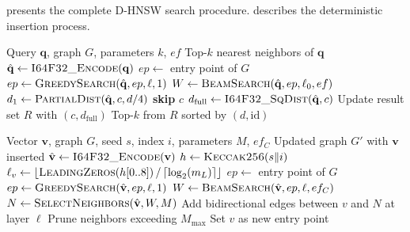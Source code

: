 \documentclass[10pt,journal]{IEEEtran}
\newcommand{\dhnsw}{\textsc{D-HNSW}}
\begin{document}
 presents the complete \dhnsw{} search procedure.  describes the deterministic insertion process.

\begin{algorithm}[t]
  \caption{\dhnsw{} Deterministic Search}
  \label{alg:dhnsw_search}
  \begin{algorithmic}[1]
    \REQUIRE Query $\mathbf{q}$, graph $G$, parameters $k$, $ef$
    \ENSURE Top-$k$ nearest neighbors of $\mathbf{q}$
    \STATE $\hat{\mathbf{q}} \leftarrow \textsc{I64F32\_Encode}(\mathbf{q})$
    \STATE $ep \leftarrow$ entry point of $G$
      \STATE $ep \leftarrow \textsc{GreedySearch}(\hat{\mathbf{q}}, ep, \ell, 1)$
    \ENDFOR
    \STATE $W \leftarrow \textsc{BeamSearch}(\hat{\mathbf{q}}, ep, \ell_0, ef)$
    \STATE {}
      \STATE $d_1 \leftarrow \textsc{PartialDist}(\hat{\mathbf{q}}, c, d/4)$
        \STATE \textbf{skip} $c$ 
      \ELSE
        \STATE $d_{\text{full}} \leftarrow \textsc{I64F32\_SqDist}(\hat{\mathbf{q}}, c)$
        \STATE Update result set $R$ with $(c, d_{\text{full}})$
      \ENDIF
    \ENDFOR
    \RETURN Top-$k$ from $R$ sorted by $(d, \text{id})$
  \end{algorithmic}
\end{algorithm}

\begin{algorithm}[t]
  \caption{\dhnsw{} Deterministic Insert}
  \label{alg:dhnsw_insert}
  \begin{algorithmic}[1]
    \REQUIRE Vector $\mathbf{v}$, graph $G$, seed $s$, index $i$, parameters $M$, $ef_C$
    \ENSURE Updated graph $G'$ with $\mathbf{v}$ inserted
    \STATE $\hat{\mathbf{v}} \leftarrow \textsc{I64F32\_Encode}(\mathbf{v})$
    \STATE $h \leftarrow \textsc{Keccak256}(s \| i)$ 
    \STATE $\ell_v \leftarrow \lfloor \textsc{LeadingZeros}(h[0..8]) \,/\, \lceil \log_2(m_L) \rceil \rfloor$ 
    \STATE $ep \leftarrow$ entry point of $G$
      \STATE $ep \leftarrow \textsc{GreedySearch}(\hat{\mathbf{v}}, ep, \ell, 1)$
    \ENDFOR
      \STATE $W \leftarrow \textsc{BeamSearch}(\hat{\mathbf{v}}, ep, \ell, ef_C)$
      \STATE $N \leftarrow \textsc{SelectNeighbors}(\hat{\mathbf{v}}, W, M)$
      \STATE Add bidirectional edges between $v$ and $N$ at layer $\ell$
      \STATE Prune neighbors exceeding $M_{\max}$
    \ENDFOR
      \STATE Set $v$ as new entry point
    \ENDIF
  \end{algorithmic}
\end{algorithm}
\end{document}
